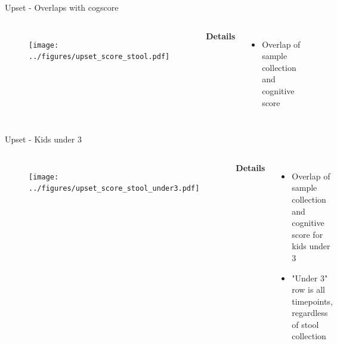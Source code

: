 
\begin{frame}{Upset - Overlaps with cogscore}
    \begin{columns}[c] %

    
        \begin{figure}
        \texttt{[image: ../figures/upset\_score\_stool.pdf]}
        \end{figure}

    
        \textbf{Details}
        \begin{itemize}
            \item Overlap of sample collection and cognitive score
        \end{itemize}

    \end{columns}

\end{frame}

\begin{frame}{Upset - Kids under 3}
    \begin{columns}[c] %

    
        \begin{figure}
        \texttt{[image: ../figures/upset\_score\_stool\_under3.pdf]}
        \end{figure}

    
        \textbf{Details}
        \begin{itemize}
            \item Overlap of sample collection and cognitive score for kids under 3
            \item "Under 3" row is all timepoints, regardless of stool collection
        \end{itemize}

    \end{columns}

\end{frame}

